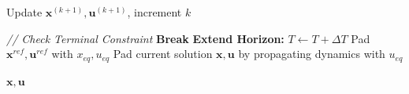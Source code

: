 \begin{algorithm}[H]
\begin{algorithmic}[1]
        \State Update $\mathbf{x}^{(k+1)}, \mathbf{u}^{(k+1)}$, increment $k$
        
    
    \State \textit{// Check Terminal Constraint}
        \State \textbf{Break} 
    \Else
        \State \textbf{Extend Horizon:} $T \leftarrow T + \Delta T$
        \State Pad $\mathbf{x}^{ref}, \mathbf{u}^{ref}$ with $x_{eq}, u_{eq}$
        \State Pad current solution $\mathbf{x}, \mathbf{u}$ by propagating dynamics with $u_{eq}$
    \EndIf
\EndWhile

\State \Return $\mathbf{x}, \mathbf{u}$
\end{algorithmic}
\end{algorithm}

